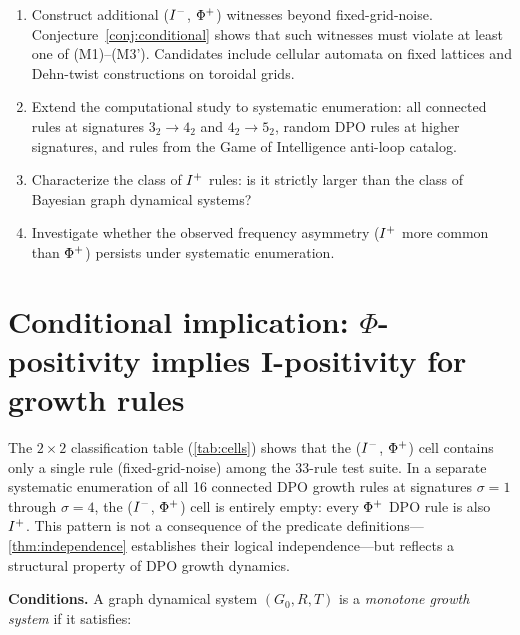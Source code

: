 \documentclass{../shared/primo}
\begin{document}
\begin{enumerate}
\item Construct additional ($I\textsuperscript{$-$}$, $\Phi\textsuperscript{+}$) witnesses beyond fixed-grid-noise. Conjecture~\ref{conj:conditional} shows that such witnesses must violate at least one of (M1)--(M3'). Candidates include cellular automata on fixed lattices and Dehn-twist constructions on toroidal grids.

\item Extend the computational study to systematic enumeration: all connected rules at signatures $3_2 \to 4_2$ and $4_2 \to 5_2$, random DPO rules at higher signatures, and rules from the Game of Intelligence anti-loop catalog.

\item Characterize the class of $I\textsuperscript{+}$ rules: is it strictly larger than the class of Bayesian graph dynamical systems?

\item Investigate whether the observed frequency asymmetry ($I\textsuperscript{+}$ more common than $\Phi\textsuperscript{+}$) persists under systematic enumeration.
\end{enumerate}


\section{Conditional implication: $\Phi$-positivity implies I-positivity for growth rules}
\label{sec:conditional}

The $2 \times 2$ classification table (\cref{tab:cells}) shows that the ($I\textsuperscript{$-$}$, $\Phi\textsuperscript{+}$) cell contains only a single rule (fixed-grid-noise) among the 33-rule test suite. In a separate systematic enumeration of all 16 connected DPO growth rules at signatures $\sigma = 1$ through $\sigma = 4$, the ($I\textsuperscript{$-$}$, $\Phi\textsuperscript{+}$) cell is entirely empty: every $\Phi\textsuperscript{+}$ DPO rule is also $I\textsuperscript{+}$. This pattern is not a consequence of the predicate definitions---\cref{thm:independence} establishes their logical independence---but reflects a structural property of DPO growth dynamics.

\textbf{Conditions.} A graph dynamical system $(G_0, R, T)$ is a \emph{monotone growth system} if it satisfies:
\end{document}
